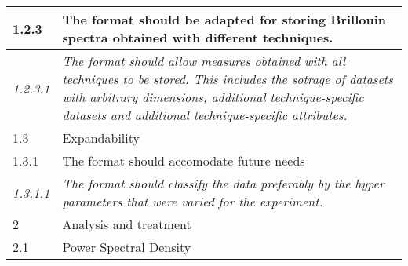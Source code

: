 \begin{tabular}{|p{1cm}|p{14cm}|}
    \rowcolor{graysuperlight} 1.2.3 &  The format should be adapted for storing Brillouin spectra obtained with different techniques. \\ \hline
    \textit{1.2.3.1} & \textit{The format should allow measures obtained with all techniques to be stored. This includes the sotrage of datasets with arbitrary dimensions, additional technique-specific datasets and additional technique-specific attributes.} \\ \hline

    \rowcolor{graylight} 1.3 & Expandability \\ \hline

    \rowcolor{graysuperlight} 1.3.1 &  The format should accomodate future needs \\ \hline
    \textit{1.3.1.1} & \textit{The format should classify the data preferably by the hyper parameters that were varied for the experiment.} \\ \hline


    \rowcolor{grayheavy} 2 & Analysis and treatment \\ \hline

    \rowcolor{graylight} 2.1 & Power Spectral Density \\ \hline
\end{tabular}

